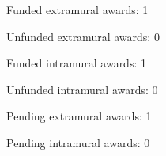 \begin{tightItemize}
    \item Funded extramural awards: 1
    \item Unfunded extramural awards: 0
    \item Funded intramural awards: 1
    \item Unfunded intramural awards: 0
    \item Pending extramural awards: 1
    \item Pending intramural awards: 0
\end{tightItemize}
